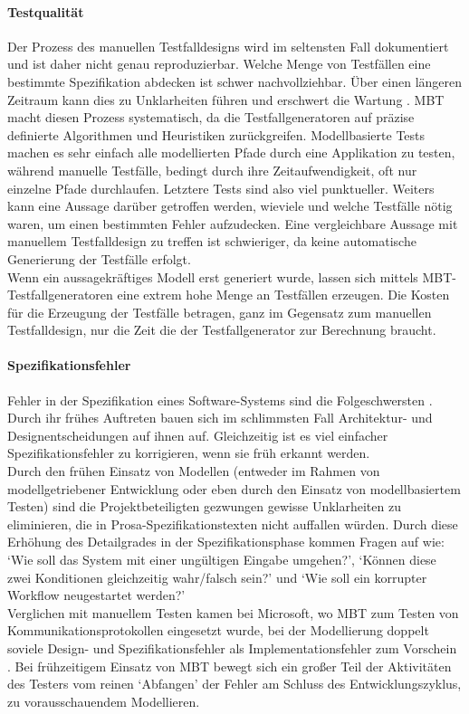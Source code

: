 \paragraph{Testqualität} Der Prozess des manuellen Testfalldesigns wird im seltensten Fall dokumentiert und ist daher nicht genau reproduzierbar. Welche Menge von Testfällen eine bestimmte Spezifikation abdecken ist schwer nachvollziehbar. Über einen längeren Zeitraum kann dies zu Unklarheiten führen und erschwert die Wartung \cite{utting_practical_2007}. \Gls{MBT} macht diesen Prozess systematisch, da die Testfallgeneratoren auf präzise definierte Algorithmen und Heuristiken zurückgreifen. Modellbasierte Tests machen es sehr einfach alle modellierten Pfade durch eine Applikation zu testen, während manuelle Testfälle, bedingt durch ihre Zeitaufwendigkeit, oft nur einzelne Pfade durchlaufen. Letztere Tests sind also viel punktueller. Weiters kann eine Aussage darüber getroffen werden, wieviele und welche Testfälle nötig waren, um einen bestimmten Fehler aufzudecken. Eine vergleichbare Aussage mit manuellem Testfalldesign zu treffen ist schwieriger, da keine automatische Generierung der Testfälle erfolgt.\\
Wenn ein aussagekräftiges Modell erst generiert wurde, lassen sich mittels MBT-Test\-fall\-ge\-ne\-ra\-tor\-en eine extrem hohe Menge an Testfällen erzeugen. Die Kosten für die Erzeugung der Testfälle betragen, ganz im Gegensatz zum manuellen Testfalldesign, nur die Zeit die der Testfallgenerator zur Berechnung braucht.

\paragraph{Spezifikationsfehler}
Fehler in der Spezifikation eines Software-Systems sind die Folgeschwersten \cite{utting_practical_2007}. Durch ihr frühes Auftreten bauen sich im schlimmsten Fall Architektur- und Designentscheidungen auf ihnen auf. Gleichzeitig ist es viel einfacher Spezifikationsfehler zu korrigieren, wenn sie früh erkannt werden.\\
Durch den frühen Einsatz von Modellen (entweder im Rahmen von modellgetriebener Entwicklung oder eben durch den Einsatz von modellbasiertem Testen) sind die Projektbeteiligten gezwungen gewisse Unklarheiten zu eliminieren, die in Prosa-Spezifikationstexten nicht auffallen würden. Durch diese Erhöhung des Detailgrades in der Spezifikationsphase kommen Fragen auf wie: `Wie soll das System mit einer ungültigen Eingabe umgehen?', `Können diese zwei Konditionen gleichzeitig wahr/falsch sein?' und `Wie soll ein korrupter Workflow neugestartet werden?'\\
Verglichen mit manuellem Testen kamen bei Microsoft, wo \Gls{MBT} zum Testen von Kommunikationsprotokollen eingesetzt wurde,  bei der Modellierung doppelt soviele Design- und Spezifikationsfehler als Implementationsfehler zum Vorschein \cite{stobie_model_2005}. Bei frühzeitigem Einsatz von MBT bewegt sich ein großer Teil der Aktivitäten des Testers vom reinen `Abfangen' der Fehler am Schluss des Entwicklungszyklus, zu vorausschauendem Modellieren.

